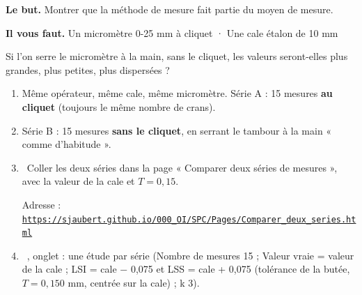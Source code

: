 \documentclass[10pt,a4paper]{article}
\begin{document}
\thispagestyle{fancy}
\begin{tcolorbox}[boite]\textbf{Le but.} Montrer que la méthode de mesure fait partie du moyen de mesure.\par\textbf{Il vous faut.} Un micromètre 0-25 mm à cliquet · Une cale étalon de 10 mm\end{tcolorbox}
\begin{tcolorbox}[pred]Si l'on serre le micromètre à la main, sans le cliquet, les valeurs seront-elles plus grandes, plus petites, plus dispersées ?\reponse\end{tcolorbox}
\begin{enumerate}[label=\textcolor{cyan}{\textbf{\arabic*.}},leftmargin=15pt,itemsep=1.5pt]
\item Même opérateur, même cale, même micromètre. Série A : 15 mesures \textbf{au cliquet} (toujours le même nombre de crans).
\item Série B : 15 mesures \textbf{sans le cliquet}, en serrant le tambour à la main « comme d'habitude ».
\item \tagW\ Coller les deux séries dans la page « Comparer deux séries de mesures », avec la valeur de la cale et $T = 0{,}15$.\par Adresse : \href{https://sjaubert.github.io/000_OI/SPC/Pages/Comparer_deux_series.html}{\nolinkurl{https://sjaubert.github.io/000_OI/SPC/Pages/Comparer_deux_series.html}}
\item \tagE\ , onglet  : une étude par série (Nombre de mesures 15 ; Valeur vraie = valeur de la cale ; LSI = cale $-$ 0,075 et LSS = cale + 0,075 (tolérance de la butée, $T = 0{,}150$ mm, centrée sur la cale) ; k 3).
\end{enumerate}
\end{document}
